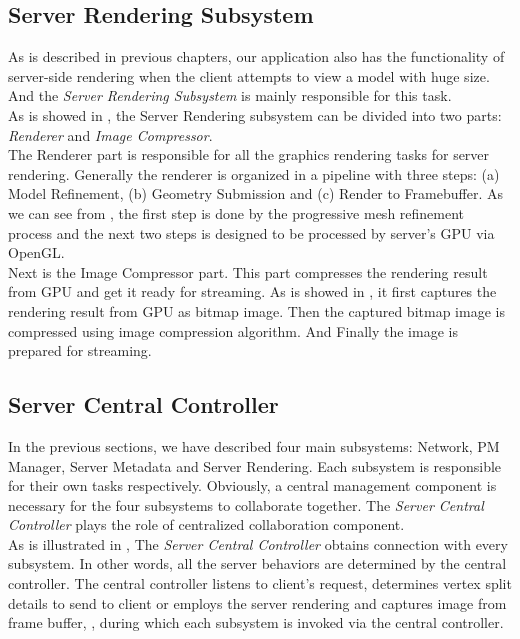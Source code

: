 \subsection{Server Rendering Subsystem}
\label{section:svrrender}

As is described in previous chapters, our application also has the functionality of server-side rendering when the client attempts to view a model with huge size. And the \emph{Server Rendering Subsystem} is mainly responsible for this task.\\ 

As is showed in , the Server Rendering subsystem can be divided into two parts: \emph{Renderer} and \emph{Image Compressor}. \\

The Renderer part is responsible for all the graphics rendering tasks for server rendering. Generally the renderer is organized in a pipeline with three steps: (a) Model Refinement, (b) Geometry Submission and (c) Render to Framebuffer. As we can see from , the first step is done by the progressive mesh refinement process and the next two steps is designed to be processed by server's GPU via OpenGL. \\

Next is the Image Compressor part. This part compresses the rendering result from GPU and get it ready for streaming. As is showed in , it first captures the rendering result from GPU as bitmap image. Then the captured bitmap image is compressed using image compression algorithm. And Finally the image is prepared for streaming. 

\subsection{Server Central Controller}
\label{section:svrcencont}


In the previous sections, we have described four main subsystems: Network, PM Manager, Server Metadata and Server Rendering. Each subsystem is responsible for their own tasks respectively. Obviously, a central management component is necessary for the four subsystems to collaborate together. The \emph{Server Central Controller} plays the role of centralized collaboration component.\\

As is illustrated in , The \emph{Server Central Controller} obtains connection with every subsystem. In other words, all the server behaviors are determined by the central controller. The central controller listens to client's request, determines vertex split details to send to client or employs the server rendering and captures image from frame buffer, \etc, during which each subsystem is invoked via the central controller. 



